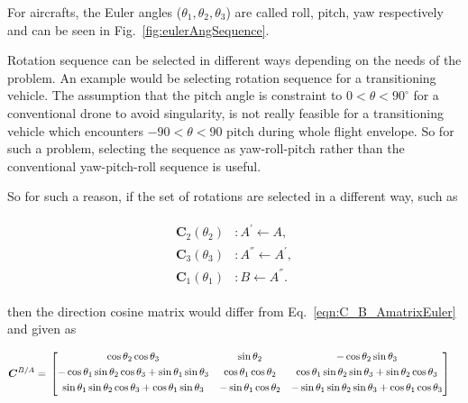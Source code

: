 For aircrafts, the Euler angles ($\theta_1,\theta_2,\theta_3$) are called roll, pitch, yaw respectively and can be seen in Fig.~\ref{fig:eulerAngSequence}.

Rotation sequence can be selected in different ways depending on the needs of the problem. 
An example would be selecting rotation sequence for a transitioning vehicle. The assumption that the pitch angle is constraint to $0<\theta<90^\circ$ for a conventional drone to avoid singularity, is not really feasible for a transitioning vehicle which encounters $-90<\theta<90$ pitch during whole flight envelope. So for such a problem, selecting the sequence as yaw-roll-pitch rather than the conventional yaw-pitch-roll sequence is useful. 

So for such a reason, if the set of rotations are selected in a different way, such as 

\begin{align}
\label{eqn:sequence2}
\begin{split}
{\bm{C}}_2(\theta_{2}) & :      A^{'} \leftarrow A   ,
\\
{\bm{C}}_3(\theta_{3}) & :      A^{''} \leftarrow A^{'}   ,
\\
{\bm{C}}_1(\theta_{1}) & :      B \leftarrow A^{''}  .
\end{split}
\end{align}

then the direction cosine matrix would differ from Eq.~\ref{eqn:C_B_AmatrixEuler} and given as

\begin{align}{\label{eqn:C_B_AmatrixEuler_132}}
\begin{split}
\bm{C}^{B/A}
& =\,
\begin{bmatrix}
\cos\theta_2 \cos\theta_3 & \sin\theta_2 & -\cos\theta_2 \sin\theta_3 \\[0.3em]
-\cos\theta_1 \sin\theta_2 \cos\theta_3 + \sin\theta_1 \sin\theta_3 & \cos\theta_1 \cos\theta_2 & \cos\theta_1 \sin\theta_2 \sin\theta_3 + \sin\theta_2 \cos\theta_3\\[0.3em]
\sin\theta_1 \sin\theta_2 \cos\theta_3 + \cos\theta_1 \sin\theta_3 & -\sin\theta_1 \cos\theta_2 & -\sin\theta_1 \sin\theta_2 \sin\theta_3 + \cos\theta_1 \cos\theta_3\\[0.3em]
\end{bmatrix}
\end{split}
\end{align}




